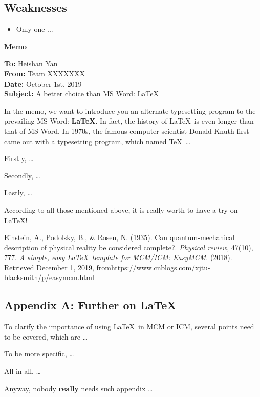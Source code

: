 \documentclass[12pt]{article}  %
\begin{document}
\subsection{Weaknesses}
\begin{itemize}
    \item Only one ...
 \end{itemize}


\begin{center}
	\textbf{Memo}
\end{center}
\begin{letter}{}
\begin{flushleft}  %
\textbf{To:} Heishan Yan\\
\textbf{From:} Team XXXXXXX\\
\textbf{Date:} October 1st, 2019\\
\textbf{Subject:} A better choice than MS Word: \LaTeX
\end{flushleft}

In the memo, we want to introduce you an alternate typesetting program to the prevailing MS Word: \textbf{\LaTeX}. In fact, the history of \LaTeX\ is even longer than that of MS Word. In 1970s, the famous computer scientist Donald Knuth first came out with a typesetting program, which named \TeX\ \ldots

Firstly, \ldots

Secondly, \ldots

Lastly, \ldots

According to all those mentioned above, it is really worth to have a try on \LaTeX! 
\end{letter}


\begin{thebibliography}{99}
 Einstein, A., Podolsky, B., \& Rosen, N. (1935). Can quantum-mechanical description of physical reality be considered complete?. \emph{Physical review}, 47(10), 777.
 \emph{A simple, easy \LaTeX\ template for MCM/ICM: EasyMCM}. (2018). Retrieved December 1, 2019, from\url{https://www.cnblogs.com/xjtu-blacksmith/p/easymcm.html}
\end{thebibliography}


\begin{subappendices}  %

\section{Appendix A: Further on \LaTeX}
To clarify the importance of using \LaTeX\ in MCM or ICM, several points need to be covered, which are \ldots

To be more specific, \ldots

All in all, \ldots

Anyway, nobody \textbf{really} needs such appendix \ldots

\end{subappendices}
\end{document}

